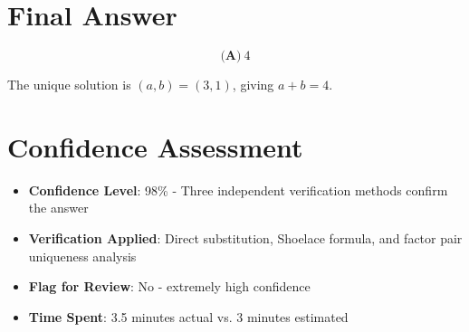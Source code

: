 \documentclass[]{article}
\begin{document}
\section*{Final Answer}
$$\boxed{\textbf{(A)}\ 4}$$

The unique solution is $(a,b) = (3,1)$, giving $a+b=4$.

\section*{Confidence Assessment}
\begin{itemize}[leftmargin=*]
    \item \textbf{Confidence Level}: 98\% - Three independent verification methods confirm the answer
    \item \textbf{Verification Applied}: Direct substitution, Shoelace formula, and factor pair uniqueness analysis
    \item \textbf{Flag for Review}: No - extremely high confidence
    \item \textbf{Time Spent}: 3.5 minutes actual vs. 3 minutes estimated
\end{itemize}
\end{document}
